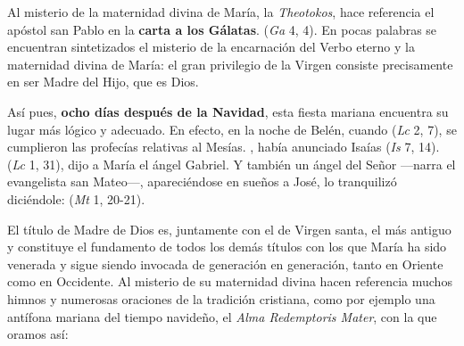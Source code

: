 \begin{body}
\begin{body}
Al misterio de la maternidad divina de María, la \emph{Theotokos}, hace referencia el apóstol san Pablo en la \textbf{carta a los Gálatas}.  (\emph{Ga} 4, 4). En pocas palabras se encuentran sintetizados el misterio de la encarnación del Verbo eterno y la maternidad divina de María: el gran privilegio de la Virgen consiste precisamente en ser Madre del Hijo, que es Dios.

Así pues, \textbf{ocho días después de la Navidad}, esta fiesta mariana encuentra su lugar más lógico y adecuado. En efecto, en la noche de Belén, cuando  (\emph{Lc} 2, 7), se cumplieron las profecías relativas al Mesías. , había anunciado Isaías (\emph{Is} 7, 14).  (\emph{Lc} 1, 31), dijo a María el ángel Gabriel. Y también un ángel del Señor ---narra el evangelista san Mateo---, apareciéndose en sueños a José, lo tranquilizó diciéndole:  (\emph{Mt} 1, 20-21).

El título de Madre de Dios es, juntamente con el de Virgen santa, el más antiguo y constituye el fundamento de todos los demás títulos con los que María ha sido venerada y sigue siendo invocada de generación en generación, tanto en Oriente como en Occidente. Al misterio de su maternidad divina hacen referencia muchos himnos y numerosas oraciones de la tradición cristiana, como por ejemplo una antífona mariana del tiempo navideño, el \emph{Alma Redemptoris Mater}, con la que oramos así: 
\end{body}
\end{body}
